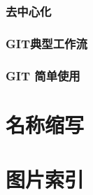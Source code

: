 \documentclass[amstex,twoside]{ctexbook}
\begin{document}
\subsection{ 去中心化	}
\subsection{  GIT典型工作流	}
\subsection{  GIT 简单使用	}


\appendix

{  }


{  }


\chapter{名称缩写}

\chapter{图片索引}
{
\renewcommand{\cleardoublepage}{}

\renewcommand\listfigurename{}
\vskip -3cm
\listoffigures 
}


\end{document}
